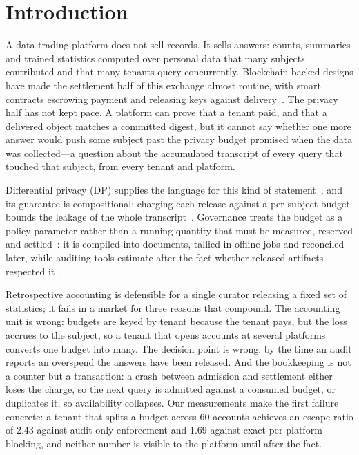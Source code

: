 \section{Introduction}
\label{sec:intro}

A data trading platform does not sell records. It sells answers: counts,
summaries and trained statistics computed over personal data that many subjects
contributed and that many tenants query concurrently. Blockchain-backed designs
have made the settlement half of this exchange almost routine, with smart
contracts escrowing payment and releasing keys against
delivery~\cite{liu2025yotta}. The privacy half has not kept pace. A platform can
prove that a tenant paid, and that a delivered object matches a committed digest,
but it cannot say whether one more answer would push some subject past the privacy
budget promised when the data was collected---a question about the accumulated
transcript of every query that touched that subject, from every tenant and platform.

Differential privacy (DP) supplies the language for this kind of
statement~\cite{fioretto2024differential,desfontaines2019differential}, and its
guarantee is compositional: charging each release against a per-subject budget bounds
the leakage of the whole transcript~\cite{mironov2017renyi,bun2016concentrated}. Governance treats the budget as a policy parameter rather than a running quantity
that must be measured, reserved and settled~\cite{kapp2024collection}: it is compiled
into documents, tallied in offline jobs and reconciled later, while auditing tools
estimate after the fact whether released artifacts respected
it~\cite{cohen2018linear,ganev2026tight,modi2026revisiting}.

Retrospective accounting is defensible for a single curator releasing a fixed set of
statistics; it fails in a market for three reasons that compound. The accounting unit
is wrong: budgets are keyed by tenant because the tenant pays, but the loss accrues to
the subject, so a tenant that opens accounts at several platforms converts one budget
into many. The decision point is wrong: by the time an audit reports an overspend the
answers have been released. And the bookkeeping is not a counter but a transaction: a
crash between admission and settlement either loses the charge, so the next query is
admitted against a consumed budget, or duplicates it, so availability collapses. Our measurements make the first failure concrete: a
tenant that splits a budget across 60 accounts achieves an escape ratio of 2.43
against audit-only enforcement and 1.69 against exact per-platform blocking, and
neither number is visible to the platform until after the fact.


